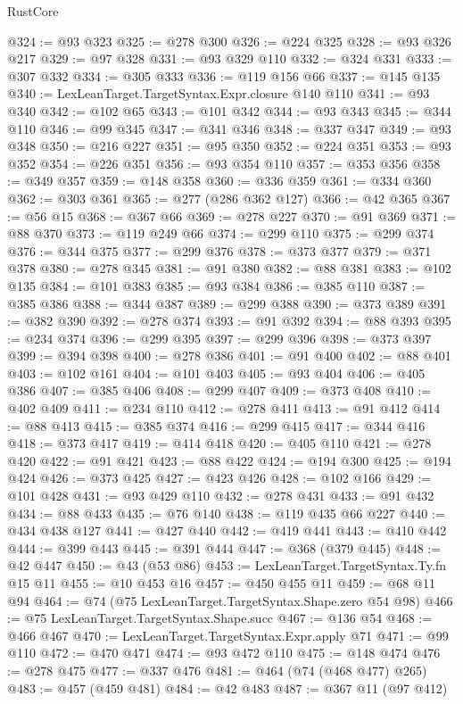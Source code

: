 \begin{lexlean}{RustCore}
\begin{coremodule}
@324 := @93 @323
@325 := @278 @300
@326 := @224 @325
@328 := @93 @326 @217
@329 := @97 @328
@331 := @93 @329 @110
@332 := @324 @331
@333 := @307 @332
@334 := @305 @333
@336 := @119 @156 @66
@337 := @145 @135
@340 := LexLeanTarget.TargetSyntax.Expr.closure @140 @110
@341 := @93 @340
@342 := @102 @65
@343 := @101 @342
@344 := @93 @343
@345 := @344 @110
@346 := @99 @345
@347 := @341 @346
@348 := @337 @347
@349 := @93 @348
@350 := @216 @227
@351 := @95 @350
@352 := @224 @351
@353 := @93 @352
@354 := @226 @351
@356 := @93 @354 @110
@357 := @353 @356
@358 := @349 @357
@359 := @148 @358
@360 := @336 @359
@361 := @334 @360
@362 := @303 @361
@365 := @277 (@286 @362 @127)
@366 := @42 @365
@367 := @56 @15
@368 := @367 @66
@369 := @278 @227
@370 := @91 @369
@371 := @88 @370
@373 := @119 @249 @66
@374 := @299 @110
@375 := @299 @374
@376 := @344 @375
@377 := @299 @376
@378 := @373 @377
@379 := @371 @378
@380 := @278 @345
@381 := @91 @380
@382 := @88 @381
@383 := @102 @135
@384 := @101 @383
@385 := @93 @384
@386 := @385 @110
@387 := @385 @386
@388 := @344 @387
@389 := @299 @388
@390 := @373 @389
@391 := @382 @390
@392 := @278 @374
@393 := @91 @392
@394 := @88 @393
@395 := @234 @374
@396 := @299 @395
@397 := @299 @396
@398 := @373 @397
@399 := @394 @398
@400 := @278 @386
@401 := @91 @400
@402 := @88 @401
@403 := @102 @161
@404 := @101 @403
@405 := @93 @404
@406 := @405 @386
@407 := @385 @406
@408 := @299 @407
@409 := @373 @408
@410 := @402 @409
@411 := @234 @110
@412 := @278 @411
@413 := @91 @412
@414 := @88 @413
@415 := @385 @374
@416 := @299 @415
@417 := @344 @416
@418 := @373 @417
@419 := @414 @418
@420 := @405 @110
@421 := @278 @420
@422 := @91 @421
@423 := @88 @422
@424 := @194 @300
@425 := @194 @424
@426 := @373 @425
@427 := @423 @426
@428 := @102 @166
@429 := @101 @428
@431 := @93 @429 @110
@432 := @278 @431
@433 := @91 @432
@434 := @88 @433
@435 := @76 @140
@438 := @119 @435 @66 @227
@440 := @434 @438 @127
@441 := @427 @440
@442 := @419 @441
@443 := @410 @442
@444 := @399 @443
@445 := @391 @444
@447 := @368 (@379 @445)
@448 := @42 @447
@450 := @43 (@53 @86)
@453 := LexLeanTarget.TargetSyntax.Ty.fn @15 @11
@455 := @10 @453 @16
@457 := @450 @455 @11
@459 := @68 @11 @94
@464 := @74 (@75 LexLeanTarget.TargetSyntax.Shape.zero @54 @98)
@466 := @75 LexLeanTarget.TargetSyntax.Shape.succ
@467 := @136 @54
@468 := @466 @467
@470 := LexLeanTarget.TargetSyntax.Expr.apply @71
@471 := @99 @110
@472 := @470 @471
@474 := @93 @472 @110
@475 := @148 @474
@476 := @278 @475
@477 := @337 @476
@481 := @464 (@74 (@468 @477) @265)
@483 := @457 (@459 @481)
@484 := @42 @483
@487 := @367 @11 (@97 @412)

\end{coremodule}
\end{lexlean}
